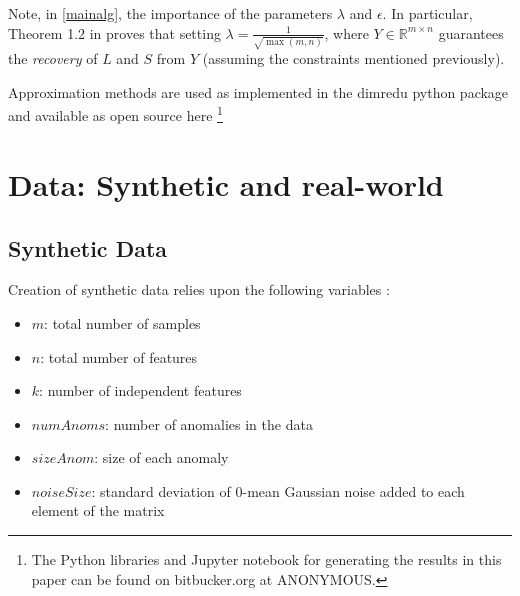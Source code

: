 \documentclass[conference]{IEEEtran}
\begin{document}
Note, in \eqref{mainalg}, the importance of the parameters $\lambda$
and $\epsilon$.  In particular, Theorem 1.2 in \cite{Candes2011}
proves that setting $\lambda = \frac{1}{\sqrt{\max(m,n)}}$, where
$Y \in \mathbb{R}^{m \times n}$ guarantees the \emph{recovery} of $L$
and $S$ from $Y$ (assuming the constraints mentioned previously).

Approximation methods are used as implemented in the dimredu python package and available as open source here
\footnote{The Python libraries and Jupyter notebook for generating the results in this paper can be found on bitbucker.org at ANONYMOUS.}


\section{Data: Synthetic and real-world}

\subsection{Synthetic Data}

Creation of synthetic data relies upon the following variables :
\begin{itemize}
\item $m$: total number of samples
\item $n$: total number of features 
\item $k$: number of independent features
\item $numAnoms$: number of anomalies in the data
\item $sizeAnom$: size of each anomaly
\item $noiseSize$: standard deviation of $0$-mean Gaussian noise added to each element of the matrix 
\end{itemize}
\end{document}
